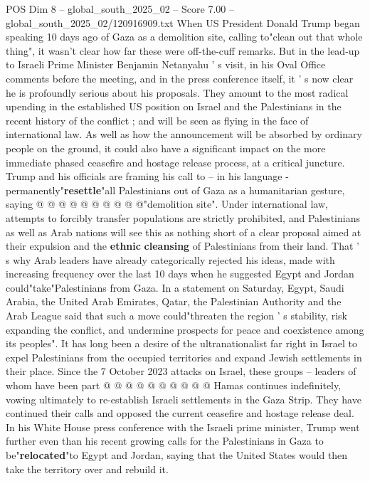 \begin{textsample}{POS Dim 8 – global\_south\_2025\_02 – Score 7.00 – global\_south\_2025\_02/120916909.txt}  \label{ex:f8_pos_077}
When US President Donald Trump began speaking 10 days ago of Gaza as a demolition site, calling to"clean out that whole thing", it wasn't clear how far these were off-the-cuff remarks.
But in the lead-up to Israeli Prime Minister Benjamin Netanyahu ' s visit, in his Oval Office comments before the meeting, and in the press conference itself, it ' s now clear he is profoundly serious about his proposals.
They amount to the most radical upending in the established US position on Israel and the Palestinians in the recent history of the conflict ; and will be seen as flying in the face of international law.
As well as how the announcement will be absorbed by ordinary people on the ground, it could also have a significant impact on the more immediate phased ceasefire and hostage release process, at a critical juncture.
Trump and his officials are framing his call to -- in his language - permanently"\textbf{resettle}"all Palestinians out of Gaza as a humanitarian gesture, saying @ @ @ @ @ @ @ @ @ @"demolition site".
Under international law, attempts to forcibly transfer populations are strictly prohibited, and Palestinians as well as Arab nations will see this as nothing short of a clear proposal aimed at their expulsion and the \textbf{ethnic} \textbf{cleansing} of Palestinians from their land.
That ' s why Arab leaders have already categorically rejected his ideas, made with increasing frequency over the last 10 days when he suggested Egypt and Jordan could"take"Palestinians from Gaza.
In a statement on Saturday, Egypt, Saudi Arabia, the United Arab Emirates, Qatar, the Palestinian Authority and the Arab League said that such a move could"threaten the region ' s stability, risk expanding the conflict, and undermine prospects for peace and coexistence among its peoples".
It has long been a desire of the ultranationalist far right in Israel to expel Palestinians from the occupied territories and expand Jewish settlements in their place.
Since the 7 October 2023 attacks on Israel, these groups -- leaders of whom have been part @ @ @ @ @ @ @ @ @ @ Hamas continues indefinitely, vowing ultimately to re-establish Israeli settlements in the Gaza Strip.
They have continued their calls and opposed the current ceasefire and hostage release deal.
In his White House press conference with the Israeli prime minister, Trump went further even than his recent growing calls for the Palestinians in Gaza to be"\textbf{relocated}"to Egypt and Jordan, saying that the United States would then take the territory over and rebuild it.

\end{textsample}
